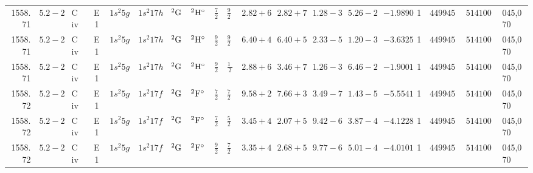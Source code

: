 \begin{table*}
\begin{tabular}{rrlcr@{ -- }lr@{ -- }lr@{ -- }lllllrrr@{ -- }rl}
   1558.71\phantom{00000000} & $5.2-2$ & C\,{\sc iv} & E1 &  $1s^{2}5g$ & $1s^{2}17h$ &       $^{2}{\rm G}$ & $^{2}{\rm H}^\circ$ &  $\frac{7}{2}$ & $\frac{9}{2}$  & $2.82+6$ & $2.82+7$ & $1.28-3$ & $5.26-2$ & $ -1.9890$ &     1 & $449945.20$ & $514100.70$ & 045,070 \\
   1558.71\phantom{00000000} & $5.2-2$ & C\,{\sc iv} & E1 &  $1s^{2}5g$ & $1s^{2}17h$ &       $^{2}{\rm G}$ & $^{2}{\rm H}^\circ$ &  $\frac{9}{2}$ & $\frac{9}{2}$  & $6.40+4$ & $6.40+5$ & $2.33-5$ & $1.20-3$ & $ -3.6325$ &     1 & $449945.20$ & $514100.70$ & 045,070 \\
   1558.71\phantom{00000000} & $5.2-2$ & C\,{\sc iv} & E1 &  $1s^{2}5g$ & $1s^{2}17h$ &       $^{2}{\rm G}$ & $^{2}{\rm H}^\circ$ &  $\frac{9}{2}$ & $\frac{11}{2}$ & $2.88+6$ & $3.46+7$ & $1.26-3$ & $6.46-2$ & $ -1.9001$ &     1 & $449945.20$ & $514100.70$ & 045,070 \\
   1558.72\phantom{00000000} & $5.2-2$ & C\,{\sc iv} & E1 &  $1s^{2}5g$ & $1s^{2}17f$ &       $^{2}{\rm G}$ & $^{2}{\rm F}^\circ$ &  $\frac{7}{2}$ & $\frac{7}{2}$  & $9.58+2$ & $7.66+3$ & $3.49-7$ & $1.43-5$ & $ -5.5541$ &     1 & $449945.20$ & $514100.50$ & 045,070 \\
   1558.72\phantom{00000000} & $5.2-2$ & C\,{\sc iv} & E1 &  $1s^{2}5g$ & $1s^{2}17f$ &       $^{2}{\rm G}$ & $^{2}{\rm F}^\circ$ &  $\frac{7}{2}$ & $\frac{5}{2}$  & $3.45+4$ & $2.07+5$ & $9.42-6$ & $3.87-4$ & $ -4.1228$ &     1 & $449945.20$ & $514100.50$ & 045,070 \\
   1558.72\phantom{00000000} & $5.2-2$ & C\,{\sc iv} & E1 &  $1s^{2}5g$ & $1s^{2}17f$ &       $^{2}{\rm G}$ & $^{2}{\rm F}^\circ$ &  $\frac{9}{2}$ & $\frac{7}{2}$  & $3.35+4$ & $2.68+5$ & $9.77-6$ & $5.01-4$ & $ -4.0101$ &     1 & $449945.20$ & $514100.50$ & 045,070 \\
\hline
\end{tabular}
\end{table*}